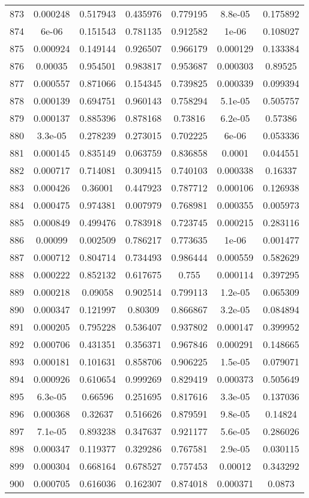 \begin{table}
\begin{tabular}{c|c|c|c|c|c|c}
873 & 0.000248 & 0.517943 & 0.435976 & 0.779195 & 8.8e-05 & 0.175892\\
874 & 6e-06 & 0.151543 & 0.781135 & 0.912582 & 1e-06 & 0.108027\\
875 & 0.000924 & 0.149144 & 0.926507 & 0.966179 & 0.000129 & 0.133384\\
876 & 0.00035 & 0.954501 & 0.983817 & 0.953687 & 0.000303 & 0.89525\\
877 & 0.000557 & 0.871066 & 0.154345 & 0.739825 & 0.000339 & 0.099394\\
878 & 0.000139 & 0.694751 & 0.960143 & 0.758294 & 5.1e-05 & 0.505757\\
879 & 0.000137 & 0.885396 & 0.878168 & 0.73816 & 6.2e-05 & 0.57386\\
880 & 3.3e-05 & 0.278239 & 0.273015 & 0.702225 & 6e-06 & 0.053336\\
881 & 0.000145 & 0.835149 & 0.063759 & 0.836858 & 0.0001 & 0.044551\\
882 & 0.000717 & 0.714081 & 0.309415 & 0.740103 & 0.000338 & 0.16337\\
883 & 0.000426 & 0.36001 & 0.447923 & 0.787712 & 0.000106 & 0.126938\\
884 & 0.000475 & 0.974381 & 0.007979 & 0.768981 & 0.000355 & 0.005973\\
885 & 0.000849 & 0.499476 & 0.783918 & 0.723745 & 0.000215 & 0.283116\\
886 & 0.00099 & 0.002509 & 0.786217 & 0.773635 & 1e-06 & 0.001477\\
887 & 0.000712 & 0.804714 & 0.734493 & 0.986444 & 0.000559 & 0.582629\\
888 & 0.000222 & 0.852132 & 0.617675 & 0.755 & 0.000114 & 0.397295\\
889 & 0.000218 & 0.09058 & 0.902514 & 0.799113 & 1.2e-05 & 0.065309\\
890 & 0.000347 & 0.121997 & 0.80309 & 0.866867 & 3.2e-05 & 0.084894\\
891 & 0.000205 & 0.795228 & 0.536407 & 0.937802 & 0.000147 & 0.399952\\
892 & 0.000706 & 0.431351 & 0.356371 & 0.967846 & 0.000291 & 0.148665\\
893 & 0.000181 & 0.101631 & 0.858706 & 0.906225 & 1.5e-05 & 0.079071\\
894 & 0.000926 & 0.610654 & 0.999269 & 0.829419 & 0.000373 & 0.505649\\
895 & 6.3e-05 & 0.66596 & 0.251695 & 0.817616 & 3.3e-05 & 0.137036\\
896 & 0.000368 & 0.32637 & 0.516626 & 0.879591 & 9.8e-05 & 0.14824\\
897 & 7.1e-05 & 0.893238 & 0.347637 & 0.921177 & 5.6e-05 & 0.286026\\
898 & 0.000347 & 0.119377 & 0.329286 & 0.767581 & 2.9e-05 & 0.030115\\
899 & 0.000304 & 0.668164 & 0.678527 & 0.757453 & 0.00012 & 0.343292\\
900 & 0.000705 & 0.616036 & 0.162307 & 0.874018 & 0.000371 & 0.0873\\
\end{tabular}
\end{table}
